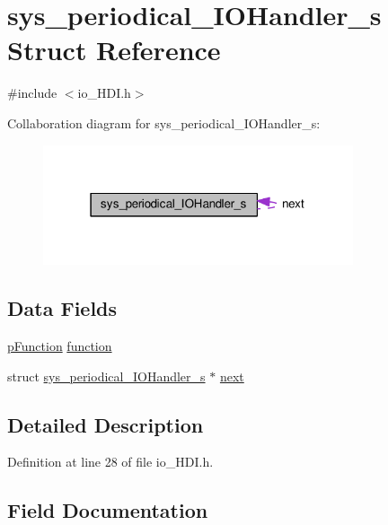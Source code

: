 \hypertarget{structsys__periodical__IOHandler__s}{}\section{sys\+\_\+periodical\+\_\+\+I\+O\+Handler\+\_\+s Struct Reference}
\label{structsys__periodical__IOHandler__s}


{\ttfamily \#include $<$io\+\_\+\+H\+D\+I.\+h$>$}



Collaboration diagram for sys\+\_\+periodical\+\_\+\+I\+O\+Handler\+\_\+s\+:\nopagebreak
\begin{figure}[H]
\begin{center}
\leavevmode
\includegraphics[width=259pt]{db/d16/structsys__periodical__IOHandler__s__coll__graph}
\end{center}
\end{figure}
\subsection*{Data Fields}
\begin{DoxyCompactItemize}
\item 
\hyperlink{definitions_8h_aed53e618f2025481fbe48a5098f70079}{p\+Function} \hyperlink{structsys__periodical__IOHandler__s_af22c738940f827dc20853e9e0edc0a56}{function}
\item 
struct \hyperlink{structsys__periodical__IOHandler__s}{sys\+\_\+periodical\+\_\+\+I\+O\+Handler\+\_\+s} $\ast$ \hyperlink{structsys__periodical__IOHandler__s_a36ad85ffbae299cfa418f69b6f2d745e}{next}
\end{DoxyCompactItemize}


\subsection{Detailed Description}


Definition at line 28 of file io\+\_\+\+H\+D\+I.\+h.



\subsection{Field Documentation}
\hypertarget{structsys__periodical__IOHandler__s_af22c738940f827dc20853e9e0edc0a56}{}
